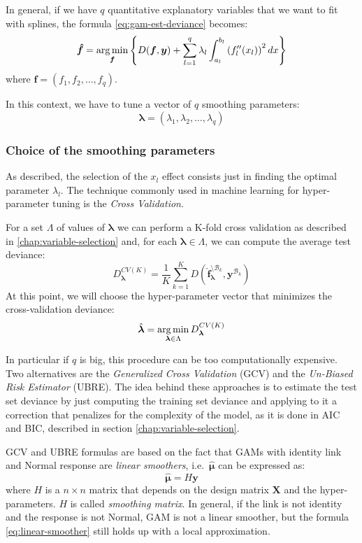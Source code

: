 \documentclass[a4paper, nobind]{templates/ociamthesis}
\theoremstyle{definition}
\theoremstyle{definition}
\theoremstyle{definition}
\theoremstyle{remark}
\begin{document}
In general, if we have \(q\) quantitative explanatory variables that we want to fit with splines, the formula \eqref{eq:gam-est-deviance} becomes:
\begin{equation}
\label{eq:gam-est-deviance-multi}
\boldsymbol{\hat{f}} = \operatorname*{arg\,min}_{\boldsymbol{f}}
{\left\{
  D(\boldsymbol{f}, \boldsymbol{y})
    + \sum_{l=1}^{q}{
      \lambda_l \int_{a_l}^{b_l}{\left( f_l''(x_l) \right)^2 dx}
    }
\right\}
} 
\end{equation}
where \(\boldsymbol{f} = \left( f_1, f_2,\dots,f_q \right)\).

In this context, we have to tune a vector of \(q\) smoothing parameters:
\[\boldsymbol{\lambda} = \left( \lambda_1, \lambda_2, \dots, \lambda_q \right)\]

\hypertarget{chap:gam-choice-lambda}{%
\subsubsection{Choice of the smoothing parameters}\label{chap:gam-choice-lambda}}

As described, the selection of the \(x_l\) effect consists just in finding the optimal parameter \(\lambda_l\). The technique commonly used in machine learning for hyper-parameter tuning is the \emph{Cross Validation}.

For a set \(\Lambda\) of values of \(\boldsymbol{\lambda}\) we can perform a K-fold cross validation as described in \ref{chap:variable-selection} and, for each \(\boldsymbol{\lambda}\in\Lambda\), we can compute the average test deviance:
\[
D^{CV(K)}_{\boldsymbol{\lambda}} =
\frac{1}{K} \sum_{k=1}^{K}{
D\left(
\boldsymbol{\hat{f}}_{\boldsymbol{\lambda}}^{\setminus \mathcal{B}_k}, \boldsymbol{y}^{\mathcal{B}_k}
\right)
}
\]
At this point, we will choose the hyper-parameter vector that minimizes the cross-validation deviance:
\[
\hat{\boldsymbol{\lambda}} = \operatorname*{arg\,min}_{\boldsymbol{\lambda}\in\Lambda}{D^{CV(K)}_{\boldsymbol{\lambda}}}
\]

In particular if \(q\) is big, this procedure can be too computationally expensive. Two alternatives are the \emph{Generalized Cross Validation} (GCV) and the \emph{Un-Biased Risk Estimator} (UBRE). The idea behind these approaches is to estimate the test set deviance by just computing the training set deviance and applying to it a correction that penalizes for the complexity of the model, as it is done in AIC and BIC, described in section \ref{chap:variable-selection}.

GCV and UBRE formulas are based on the fact that GAMs with identity link and Normal response are \emph{linear smoothers}, i.e.~\(\boldsymbol{\hat{\mu}}\) can be expressed as:
\begin{equation}
\label{eq:linear-smoother}
\boldsymbol{\hat{\mu}} = H \boldsymbol{y}
\end{equation}
where \(H\) is a \(n\times n\) matrix that depends on the design matrix \(\boldsymbol{X}\) and the hyper-parameters. \(H\) is called \emph{smoothing matrix}. In general, if the link is not identity and the response is not Normal, GAM is not a linear smoother, but the formula \eqref{eq:linear-smoother} still holds up with a local approximation.
\end{document}
